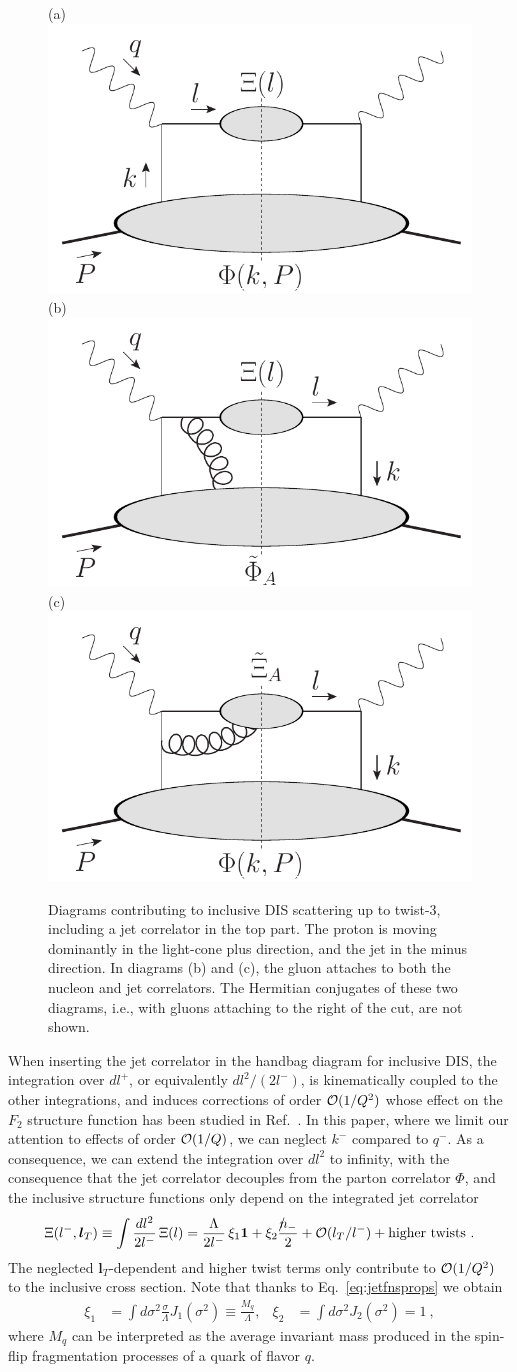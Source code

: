 \documentclass[preprintnumbers,floatfix,nofootinbib]{revtex4}
\newcommand{\nslash}{n \hspace{-0.24cm} / \,}
\newcommand{\mj}{M_q}
\newcommand{\id}{{\bm 1}
}
\begin{document}
\begin{figure}[bt]
  \centering
  (a)\includegraphics[width=0.3\linewidth,valign=t]{jetdiagram0}
  \hfill
  (b)\includegraphics[width=0.3\linewidth,valign=t]{jetdiagram2}
  \hfill
  (c)\includegraphics[width=0.3\linewidth,valign=t]{jetdiagram1}
  \caption{Diagrams contributing to inclusive DIS scattering up to twist-3, including a jet correlator in the top part. The proton is moving dominantly in the light-cone plus direction, and the jet in the minus direction. In diagrams (b) and (c), the gluon attaches to both the nucleon and jet correlators. The Hermitian conjugates of these two diagrams, i.e., with gluons attaching to the right of the cut, are not shown.
  }
  \label{fig:handbags}
\end{figure}

When inserting the jet correlator in the handbag diagram for inclusive DIS, the integration over $dl^+$, or equivalently $dl^2/(2l^-)$, is kinematically coupled to the other integrations, and induces corrections of order ${\cal O}(1/Q^2)$ whose effect on the $F_2$ structure function has been studied in Ref.~\cite{Accardi:2008ne}. In this paper, where we limit our
attention to effects of order ${\cal O}(1/Q)$, we can neglect $k^-$ compared to $q^-$. As a consequence, we can extend the integration over $dl^2$ to infinity, with the consequence that the jet correlator decouples from the parton correlator $\Phi$, and the inclusive structure functions only depend on the integrated jet correlator 
\begin{equation} 
  \Xi(l^-,{\bm l_T}) \equiv \int \frac{dl^2}{2l^-} \, \Xi(l) 
    =  \frac{\Lambda}{2 l^-}\,\xi_1 \id
    +  \xi_2 \frac{\nslash_-}{2} 
    + {\cal O}(l_T/l^-) + \text{higher\ twists} \ .
\end{equation} 
The neglected ${\bm l_T}$-dependent and higher twist terms only contribute to ${\cal O}(1/Q^2)$ to the inclusive cross section. Note that thanks to Eq.~\eqref{eq:jetfnsprops} we obtain
\begin{align}
\xi_1 &= \int d\sigma^2 \frac{\sigma}{\Lambda} J_1(\sigma^2) 
       \equiv \frac{\mj}{\Lambda},
&
\xi_2 &= \int d\sigma^2 J_2(\sigma^2) = 1 \ ,
\end{align} 
where $\mj$ can be interpreted as the average invariant mass produced in the spin-flip fragmentation processes of a quark of flavor $q$.
\end{document}
